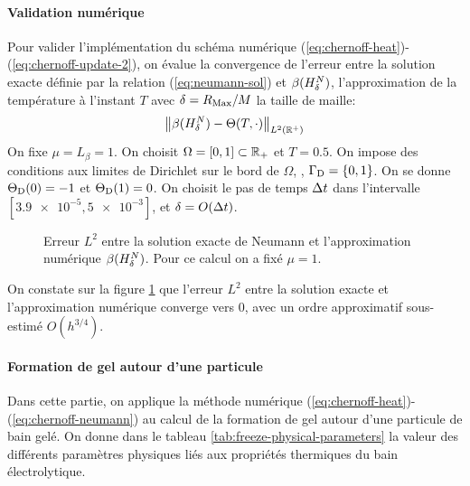 \paragraph{Validation numérique}
Pour valider l'implémentation du schéma numérique
(\ref{eq:chernoff-heat})-(\ref{eq:chernoff-update-2}), on évalue la
convergence de l'erreur entre la solution exacte définie par la
relation (\ref{eq:neumann-sol}) et $\beta(H^N_\delta)$,
l'approximation de la température à l'instant $T$ avec $\delta =
R_\mathrm{Max}/M$ la taille de maille:
\begin{equation}
\left\lVert \beta(H^N_\delta) - \Theta(T, \cdot) \right\rVert_{L^2(\mathbb R^+)}
\end{equation}
On fixe $\mu = L_\beta =
1$. On choisit $\Omega = [0, 1] \subset \mathbb R_+$ et $T = 0.5$. On
impose des conditions aux limites de Dirichlet sur le bord de
$\Omega$, \ie, $\Gamma_\mathrm{D} = \left\{ 0, 1 \right\}$. On se donne
$\Theta_\mathrm{D}(0) = -1$ et $\Theta_\mathrm{D}(1) =
0$. On choisit le pas de temps $\Delta t$ dans l'intervalle
$[\num{3.9e-5}, \num{5e-3}]$, et $\delta = O(\Delta t)$.

\begin{figure}[h]
  \begin{center}
    
    \caption{Erreur $L^2$ entre la solution exacte de Neumann et
      l'approximation numérique $\beta(H^N_\delta)$. Pour ce
      calcul on a fixé $\mu = 1$.}
    \label{fig:neumann-convergence}
  \end{center}
\end{figure}

On constate sur la figure \ref{fig:neumann-convergence} que l'erreur
$L^2$ entre la solution exacte et l'approximation numérique converge
vers 0, avec un ordre approximatif sous-estimé  $O(h^{3/4})$.


\paragraph{Formation de gel autour d'une particule}
Dans cette partie, on applique la méthode numérique
(\ref{eq:chernoff-heat})-(\ref{eq:chernoff-neumann}) au calcul de la
formation de gel autour d'une particule de bain gelé.  On donne dans
le tableau \ref{tab:freeze-physical-parameters} la valeur des
différents paramètres physiques liés aux propriétés thermiques du bain
électrolytique.

